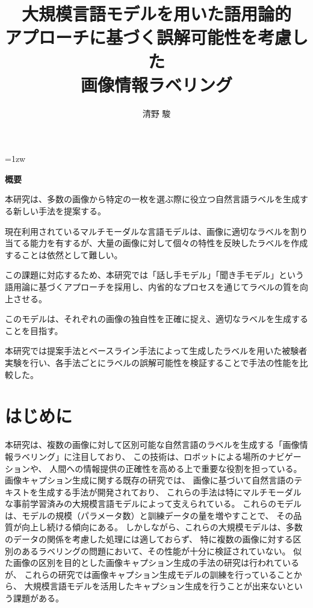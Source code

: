 \documentclass[a4paper,11pt]{jreport}
\title{大規模言語モデルを用いた語用論的\\アプローチに基づく誤解可能性を考慮した\\画像情報ラベリング}
\author{清野 駿}
\begin{document}
\maketitle
\thispagestyle{empty}
\newpage

\thispagestyle{empty}
\vspace*{20pt plus 1fil}
\parindent=1zw
\noindent
\begin{center}
{\bf 概要}
\vspace{5mm}
\end{center}
本研究は、多数の画像から特定の一枚を選ぶ際に役立つ自然言語ラベルを生成する新しい手法を提案する。

現在利用されているマルチモーダルな言語モデルは、画像に適切なラベルを割り当てる能力を有するが、大量の画像に対して個々の特性を反映したラベルを作成することは依然として難しい。

この課題に対応するため、本研究では「話し手モデル」「聞き手モデル」という語用論に基づくアプローチを採用し、内省的なプロセスを通じてラベルの質を向上させる。

このモデルは、それぞれの画像の独自性を正確に捉え、適切なラベルを生成することを目指す。

本研究では提案手法とベースライン手法によって生成したラベルを用いた被験者実験を行い、各手法ごとにラベルの誤解可能性を検証することで手法の性能を比較した。

\par
\vspace{0pt plus 1fil}
\newpage

\tableofcontents
\listoffigures

\pagebreak \setcounter{page}{1}


\chapter{はじめに}

本研究は、複数の画像に対して区別可能な自然言語のラベルを生成する「画像情報ラベリング」に注目しており、
この技術は、ロボットによる場所のナビゲーションや、
人間への情報提供の正確性を高める上で重要な役割を担っている\cite{Yin2023}。
画像キャプション生成に関する既存の研究では、
画像に基づいて自然言語のテキストを生成する手法が開発されており\cite{Farhadi2010, Vinyals2017, Dai2023}、
これらの手法は特にマルチモーダルな事前学習済みの大規模言語モデルによって支えられている。
これらのモデルは、モデルの規模（パラメータ数）と訓練データの量を増やすことで、
その品質が向上し続ける傾向にある\cite{Devlin2019}。
しかしながら、これらの大規模モデルは、多数のデータの関係を考慮した処理には適しておらず、
特に複数の画像に対する区別のあるラベリングの問題において、その性能が十分に検証されていない。
似た画像の区別を目的とした画像キャプション生成の手法の研究は行われている\cite{Vedantam2017,Cohn-Gordon2018,Nie2020,Andreas2016}が、
これらの研究では画像キャプション生成モデルの訓練を行っていることから、
大規模言語モデルを活用したキャプション生成を行うことが出来ないという課題がある。
\end{document}
